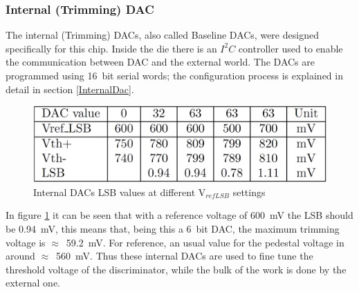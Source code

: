 \subsubsection{Internal (Trimming) DAC}
The internal (Trimming) DACs, also called Baseline DACs, were designed specifically for this chip. Inside the die there is an $I^2C$ controller used to enable the communication between DAC and the external world.
The DACs are programmed using 16~bit serial words; the configuration process is explained in detail in section \ref{InternalDac}.
\begin{figure}[H]
	\centering
	\includegraphics[width=0.5\linewidth]{IMG/ch2/INTDACTABLE}
	\caption{Internal DACs LSB values at different V$_{refLSB}$ settings}
	\label{fig:intdactable}
\end{figure}
\noindent In figure \ref{fig:intdactable} it can be seen that with a reference voltage of 600~mV the LSB should be 0.94~mV, this means that, being this a 6~bit DAC, the maximum trimming voltage is $\approx$~59.2~mV. For reference, an usual value for the pedestal voltage in around $\approx$~560~mV. Thus these internal DACs are used to fine tune the threshold voltage of the discriminator, while the bulk of the work is done by the external one.   
\newpage
